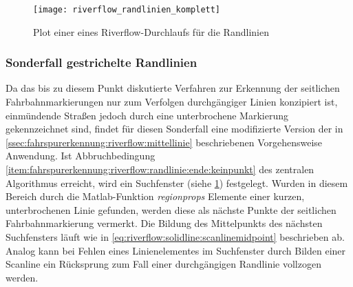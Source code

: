\begin{figure}[H]
  \centering
  \texttt{[image: riverflow\_randlinien\_komplett]}
  \caption{Plot einer eines Riverflow-Durchlaufs für die Randlinien}
  \label{fig:riverflow:randlinien:plot_komplett}
\end{figure}

\subsubsection{Sonderfall gestrichelte Randlinien}
\label{sssec:fahrspurerkennung:riverflow:randlinie:gestrichelt}
Da das bis zu diesem Punkt diskutierte Verfahren zur Erkennung der seitlichen Fahrbahnmarkierungen nur zum Verfolgen durchgängiger Linien konzipiert ist, einmündende Straßen jedoch durch eine unterbrochene Markierung gekennzeichnet sind, findet für diesen Sonderfall eine modifizierte Version der in \ref{ssec:fahrspurerkennung:riverflow:mittellinie} beschriebenen Vorgehensweise Anwendung. Ist Abbruchbedingung \ref{item:fahrspurerkennung:riverflow:randlinie:ende:keinpunkt} des zentralen Algorithmus erreicht, wird ein Suchfenster (siehe \ref{fig:riverflow:randlinien:plot_komplett}) festgelegt. Wurden in diesem Bereich durch die Matlab-Funktion \emph{regionprops} Elemente einer kurzen, unterbrochenen Linie gefunden, werden diese als nächste Punkte der seitlichen Fahrbahnmarkierung vermerkt. Die Bildung des Mittelpunkts  des nächsten Suchfensters läuft wie in \eqref{eq:riverflow:solidline:scanlinemidpoint} beschrieben ab. Analog kann bei Fehlen eines Linienelementes im Suchfenster durch Bilden einer Scanline ein Rücksprung zum Fall einer durchgängigen Randlinie vollzogen werden.
